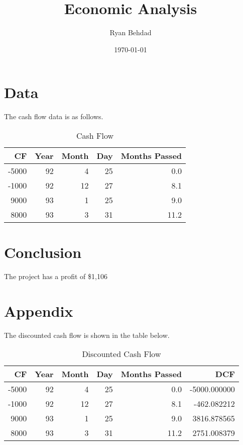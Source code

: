 \documentclass{article}%
\title{Economic Analysis}%
\author{Ryan Behdad}%
\date{\today}%
\begin{document}
%
\normalsize%
\maketitle%
\section{Data}%
\label{sec:Data}%
The cash flow data is as follows.%


\begin{table}[htbp]%
\caption{Cash Flow}%
\centering%
\begin{tabular}{rrrrr}
\toprule
   CF &  Year &  Month &  Day &  Months Passed \\
\midrule
-5000 &    92 &      4 &   25 &            0.0 \\
-1000 &    92 &     12 &   27 &            8.1 \\
 9000 &    93 &      1 &   25 &            9.0 \\
 8000 &    93 &      3 &   31 &           11.2 \\
\bottomrule
\end{tabular}
%
\end{table}

%
\section{Conclusion}%
\label{sec:Conclusion}%
The project has a profit of \$1,106

%
\section{Appendix}%
\label{sec:Appendix}%
The discounted cash flow is shown in the table below.%


\begin{table}[htbp]%
\caption{Discounted Cash Flow}%
\centering%
\begin{tabular}{rrrrrr}
\toprule
   CF &  Year &  Month &  Day &  Months Passed &          DCF \\
\midrule
-5000 &    92 &      4 &   25 &            0.0 & -5000.000000 \\
-1000 &    92 &     12 &   27 &            8.1 &  -462.082212 \\
 9000 &    93 &      1 &   25 &            9.0 &  3816.878565 \\
 8000 &    93 &      3 &   31 &           11.2 &  2751.008379 \\
\bottomrule
\end{tabular}
%
\end{table}

%
\end{document}
